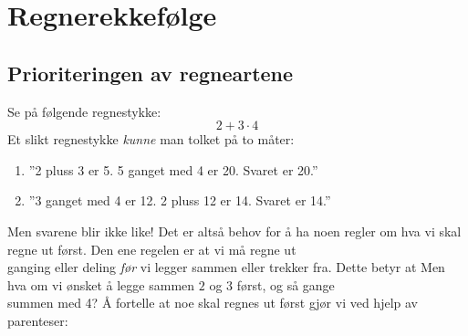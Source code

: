 




\section{Regnerekkefølge}
\subsection*{Prioriteringen av regneartene}
Se på følgende regnestykke:
\[ 2+3\cdot4 \]
Et slikt regnestykke \textsl{kunne} man tolket på to måter:
\begin{enumerate}[label=(\roman*)]
	\item ''2 pluss 3 er 5. 5 ganget med 4 er 20. Svaret er 20.''
	\item ''3 ganget med 4 er 12. 2 pluss 12 er 14. Svaret er 14.''
\end{enumerate}
Men svarene blir ikke like! Det er altså behov for å ha noen regler om hva vi skal regne ut først. Den ene regelen er at vi må regne ut \\ganging eller deling \textsl{før} vi legger sammen eller trekker fra. Dette betyr at
\st{ \vs
}
Men hva om vi ønsket å legge sammen $ 2 $ og $ 3 $ først, og så gange\\ summen med 4? Å fortelle at noe skal regnes ut først gjør vi ved hjelp av parenteser:
\st{\vs
}\regv

\newpage
{}
